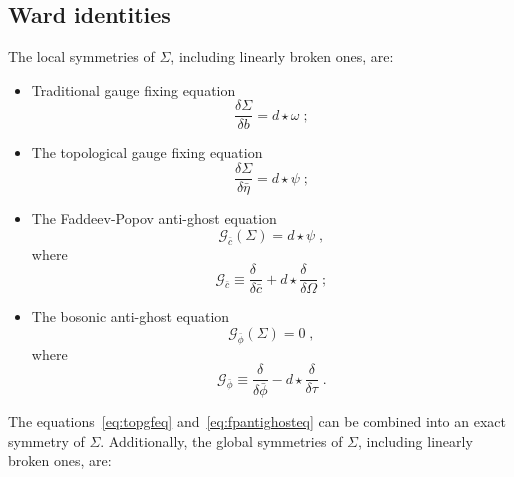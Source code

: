 \documentclass[../main.tex]{subfiles}
\begin{document}
\subsection{Ward identities}%
\label{ssec:ward_identities}
%
The local symmetries of $ \Sigma $, including linearly broken ones, are:
\begin{itemize}
  \item Traditional gauge fixing equation
        \begin{equation}
          \label{eq:gfeq}
          \frac{ \delta \Sigma }{ \delta b } = d \star \omega  \;;
        \end{equation}
  \item The topological gauge fixing equation
        \begin{equation}
          \label{eq:topgfeq}
          \frac{\delta\Sigma}{\delta\bar{\eta}} = d\star{\psi} \;;
        \end{equation}
  \item The Faddeev-Popov anti-ghost equation
        \begin{equation}
          \label{eq:fpantighosteq}
          \mathcal{G}_{\bar{c}} \left(\Sigma\right)=d\star{\psi} \;,
        \end{equation}
        where
        \begin{equation}
          \label{eq:fpantighostop}
          \mathcal{G}_{\bar{c}}\equiv \frac{\delta\phantom{c}}{\delta\bar{c}}+d\star{\frac{\delta\phantom{\Omega}}{\delta\Omega}} \;;
        \end{equation}
  \item The bosonic anti-ghost equation
        \begin{equation}
          \label{eq:bosonicantighosteq}
          \mathcal{G}_{\bar{\phi}} \left(\Sigma\right)=0\;,
        \end{equation}
        where
        \begin{equation}
          \label{eq:bosonicantighostop}
          \mathcal{G}_{\bar{\phi}}\equiv \frac{\delta}{\delta\bar{\phi}}-d\star{\frac{\delta}{\delta\tau}}\;.
        \end{equation}
\end{itemize}
The equations~\eqref{eq:topgfeq} and~\eqref{eq:fpantighosteq} can be combined into an exact symmetry of $ \Sigma $. Additionally, the global symmetries of $ \Sigma $, including linearly broken ones, are:
\end{document}
